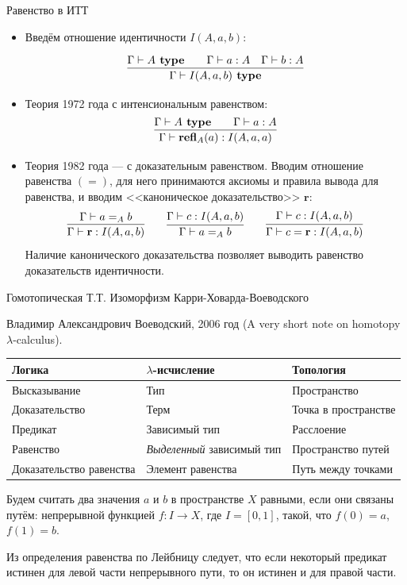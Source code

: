 \documentclass[aspectratio=169]{beamer}
\begin{document}
\begin{frame}{Равенство в ИТТ}
\begin{itemize}
\item Введём отношение идентичности $I(A,a,b)$: %

$$\infer{\Gamma\vdash I(A,a,b) \textbf{ type}}{\Gamma\vdash A \textbf{ type}\quad\quad\Gamma\vdash a:A\quad\Gamma\vdash b:A}$$

\item Теория 1972 года с интенсиональным равенством:
$$
\infer{\Gamma\vdash \textbf{refl}_A(a) : I(A,a,a)}{\Gamma\vdash A\textbf{ type}\quad\quad\Gamma\vdash a:A}
$$

\item Теория 1982 года --- с доказательным равенством.
Вводим отношение равенства $(=)$, для него принимаются аксиомы и правила вывода для равенства,
и вводим <<каноническое доказательство>> $\textbf{r}$:
$$
\infer{\Gamma\vdash \textbf{r}:I(A,a,b)}{\Gamma \vdash a =_A b}
\quad\quad
\infer{\Gamma\vdash a=_A b}{\Gamma\vdash c:I(A,a,b)}
\quad\quad
\infer{\Gamma\vdash c=\textbf{r}:I(A,a,b)}{\Gamma \vdash c:I(A,a,b)}
$$
Наличие канонического доказательства позволяет выводить равенство доказательств идентичности.
\end{itemize}
\end{frame}

\begin{frame}{Гомотопическая Т.Т. Изоморфизм Карри-Ховарда-Воеводского}

Владимир Александрович Воеводский, 2006 год (A very short note on homotopy $\lambda$-calculus).

\vspace{0.3cm}

\begin{tabular}{lll}
Логика & $\lambda$-исчисление & Топология\\\hline
Высказывание & Тип & Пространство\\
Доказательство & Терм & Точка в пространстве\\
Предикат & Зависимый тип & Расслоение\\
Равенство &\emph{Выделенный} зависимый тип & Пространство путей\\
Доказательство равенства & Элемент равенства & Путь между точками
\end{tabular}

\begin{dfn}Будем считать два значения $a$ и $b$ в пространстве $X$ равными, если они связаны путём: непрерывной функцией $f:I\rightarrow X$,
где $I = [0,1]$, такой, что $f(0)=a$, $f(1)=b$.\end{dfn}
Из определения равенства по Лейбницу следует, что если некоторый предикат истинен для левой части непрерывного пути, то он истинен и для правой части.
\end{frame}
\end{document}

